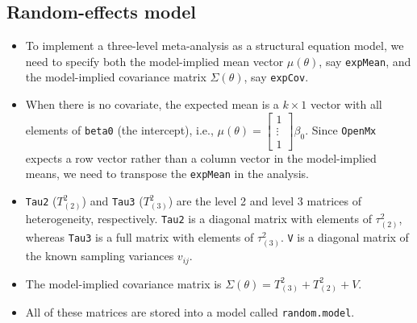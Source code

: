 \documentclass[11pt]{article}
\begin{document}
\subsection{Random-effects model}
\label{sec:orgedc7d87}
\begin{itemize}
\item To implement a three-level meta-analysis as a structural equation model, we need to specify both the model-implied mean vector \(\mu(\theta)\), say \texttt{expMean}, and the model-implied covariance matrix \(\Sigma(\theta)\), say \texttt{expCov}.
\item When there is no covariate, the expected mean is a \(k \times 1\) vector with all elements of \texttt{beta0} (the intercept), i.e., \(\mu(\theta) = \left[ \begin{array}{c} 1 \\ \vdots \\ 1 \end{array} \right]\beta_0\). Since \texttt{OpenMx} expects a row vector rather than a column vector in the model-implied means, we need to transpose the \texttt{expMean} in the analysis.
\item \texttt{Tau2} (\(T^2_{(2)}\)) and \texttt{Tau3} (\(T^2_{(3)}\)) are the level 2 and level 3 matrices of heterogeneity, respectively. \texttt{Tau2} is a diagonal matrix with elements of \(\tau^2_{(2)}\), whereas \texttt{Tau3} is a full matrix with elements of \(\tau^2_{(3)}\). \texttt{V} is a diagonal matrix of the known sampling variances \(v_{ij}\).
\item The model-implied covariance matrix is \(\Sigma(\theta) = T^2_{(3)} + T^2_{(2)} + V\).
\item All of these matrices are stored into a model called \texttt{random.model}.
\end{itemize}
\end{document}
